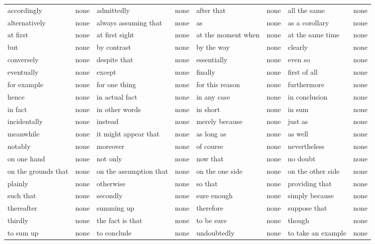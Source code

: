 {{\begin{tabular}{ |p{3.5cm}|p{1cm}|p{4cm}|p{3cm}|p{3.5cm}|p{1cm}|p{5cm}|p{2.5cm}| }
			accordingly			&none		&admittedly				&none
					&after that			&none		&all the same						&none\\
			alternatively		&none		&always assuming that	&none
					&as					&none		&as a corollary						&none\\
			at first			&none		&at first sight			&none
					&at the moment when	&none		&at the same time					&none\\
			but					&none		&by contrast			&none
					&by the way			&none		&clearly							&none\\
			conversely			&none		&despite that			&none
					&essentially		&none		&even so							&none\\
			eventually			&none		&except					&none
					&finally			&none		&first of all						&none\\
			for example			&none		&for one thing			&none
					&for this reason	&none		&furthermore						&none\\
			hence				&none		&in actual fact			&none
					&in any case		&none		&in conclusion						&none\\
			in fact				&none		&in other words			&none
					&in short			&none		&in sum								&none\\
			incidentally		&none		&instead				&none
					&merely because	 	&none		&just as							&none\\
			meanwhile			&none		&it might appear that	&none
					&as long as			&none		&as well							&none\\
			notably				&none		&moreover				&none
					&of course			&none		&nevertheless						&none\\
			on one hand			&none		&not only				&none
					&now that			&none		&no doubt							&none\\
			on the grounds that	&none		&on the assumption that	&none
					&on the one side	&none		&on the other side					&none\\
			plainly				&none		&otherwise				&none
					&so that			&none		&providing that						&none\\
			such that			&none		&secondly				&none
					&sure enough		&none		&simply because						&none\\
			thereafter			&none		&summing up				&none
					&therefore			&none		&suppose that						&none\\
			thirdly				&none		&the fact is that		&none
					&to be sure			&none		&though								&none\\
			to sum up			&none		&to conclude			&none
					&undoubtedly		&none		&to take an example					&none\\

\end{tabular}}}
